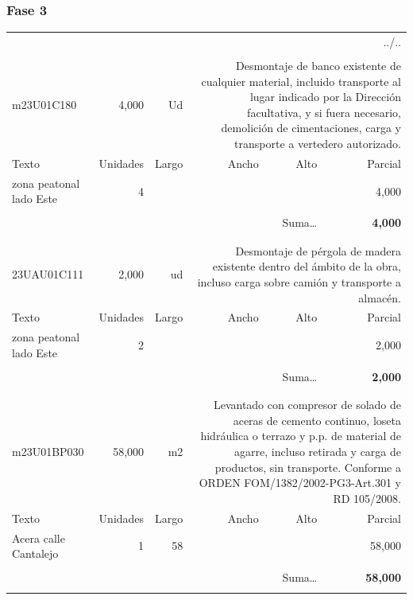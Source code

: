 \documentclass{book}%
\begin{document}
%
\subsubsection{Fase 3}%
\begin{longtable}{lrrrrr}%
\multicolumn{6}{r}{../..}\\%
\endfoot%
\endlastfoot%
&&&&&\\%
m23U01C180&     4,000& Ud&\multicolumn{3}{p{6cm}}{\scriptsize Desmontaje de banco existente de cualquier material, incluido transporte al lugar indicado por la Dirección facultativa, y si fuera necesario, demolición de cimentaciones, carga y transporte a vertedero autorizado.\normalsize}\\%
Texto&Unidades&Largo&Ancho&Alto&Parcial\\%
\hline%
\multicolumn{1}{p{3.5cm}}{ zona peatonal lado Este}&4&&&&     4,000\\%
&&&&&\\%
\multicolumn{5}{r}{Suma\ldots}&\textbf{     4,000}\\%
\hline%
&&&&&\\%
&&&&&\\%
23UAU01C111&     2,000& ud&\multicolumn{3}{p{6cm}}{\scriptsize Desmontaje de pérgola de madera existente dentro del ámbito de la obra, incluso carga sobre camión y transporte a almacén.\normalsize}\\%
Texto&Unidades&Largo&Ancho&Alto&Parcial\\%
\hline%
\multicolumn{1}{p{3.5cm}}{ zona peatonal lado Este}&2&&&&     2,000\\%
&&&&&\\%
\multicolumn{5}{r}{Suma\ldots}&\textbf{     2,000}\\%
\hline%
&&&&&\\%
&&&&&\\%
m23U01BP030&    58,000& m2&\multicolumn{3}{p{6cm}}{\scriptsize Levantado con compresor de solado de aceras de cemento continuo, loseta hidráulica o terrazo y p.p. de material de agarre, incluso retirada y carga de productos, sin transporte. Conforme a ORDEN FOM/1382/2002-PG3-Art.301 y RD 105/2008.\normalsize}\\%
Texto&Unidades&Largo&Ancho&Alto&Parcial\\%
\hline%
\multicolumn{1}{p{3.5cm}}{Acera calle Cantalejo}&1&58&&&    58,000\\%
&&&&&\\%
\multicolumn{5}{r}{Suma\ldots}&\textbf{    58,000}\\%
\hline%
&&&&&\\%

\end{longtable}
\end{document}
